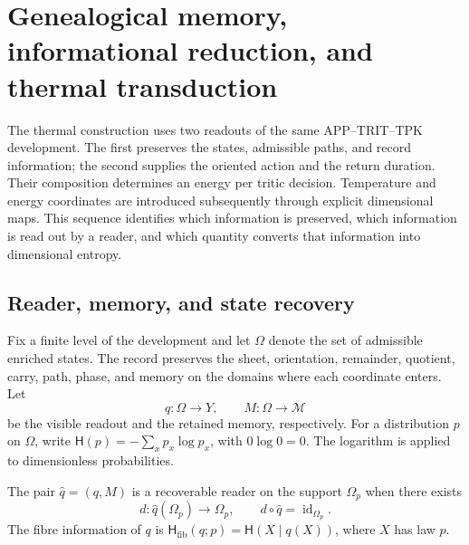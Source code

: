 
\section{Genealogical memory, informational reduction, and thermal transduction}
\label{v:ant:sec:ii-kb-aut-desarrollo}

The thermal construction uses two readouts of the same
APP--TRIT--TPK development. The first preserves the states, admissible paths,
and record information; the second supplies the oriented action
and the return duration. Their composition determines an energy per
tritic decision. Temperature and energy coordinates are introduced
subsequently through explicit dimensional maps. This sequence
identifies which information is preserved, which information is read out
by a reader, and which quantity converts that information into dimensional entropy.

\subsection{Reader, memory, and state recovery}

Fix a finite level of the development and let \(\Omega\) denote the
set of admissible enriched states. The record preserves the sheet,
orientation, remainder, quotient, carry, path, phase, and memory on the
domains where each coordinate enters. Let
\[
 q:\Omega\longrightarrow Y,\qquad
 M:\Omega\longrightarrow\mathcal M
\]
be the visible readout and the retained memory, respectively. For a
distribution \(p\) on \(\Omega\), write
\(\mathsf H(p)=-\sum_xp_x\log p_x\), with \(0\log0=0\).
The logarithm is applied to dimensionless probabilities.

\begin{definition}
The pair \(\widehat q=(q,M)\) is a recoverable reader on the support
\(\Omega_p\) when there exists
\[
 d:\widehat q(\Omega_p)\longrightarrow\Omega_p,
 \qquad d\circ\widehat q=\operatorname{id}_{\Omega_p}.
\]
The fibre information of \(q\) is
\(\mathsf H_{\mathrm{fib}}(q;p)=\mathsf H(X\mid q(X))\), where
\(X\) has law \(p\).
\end{definition}

